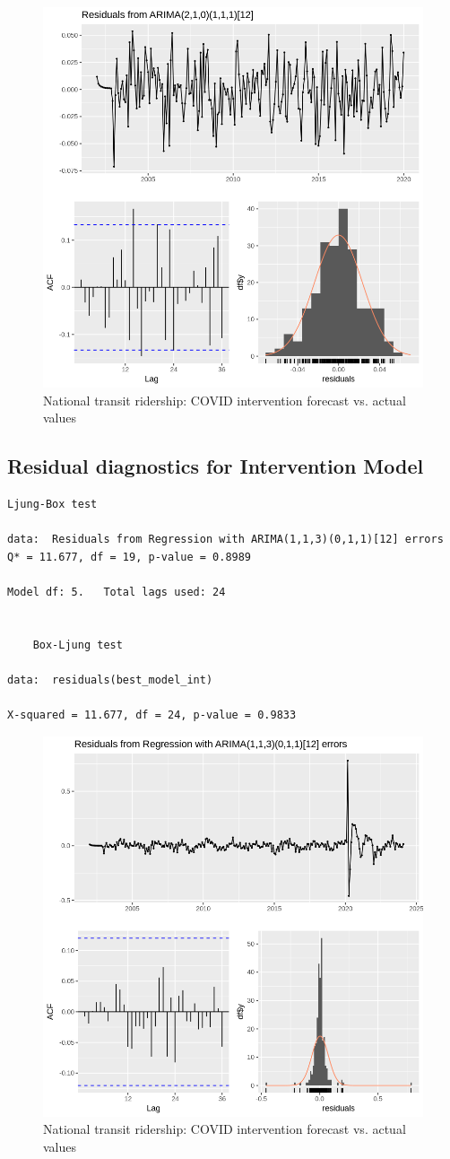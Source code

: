 \documentclass[11pt]{article}
\begin{document}
\begin{figure}[!ht]
\centering
\includegraphics[width=0.485\linewidth]{residual_diag_1.png}
\caption{National transit ridership: COVID intervention forecast vs. actual values}
\label{f:pre-COVID_residual_diagnostics}
\end{figure}


\subsection*{Residual diagnostics for Intervention Model}
\begin{verbatim}
Ljung-Box test

data:  Residuals from Regression with ARIMA(1,1,3)(0,1,1)[12] errors  
Q* = 11.677, df = 19, p-value = 0.8989

Model df: 5.   Total lags used: 24


	Box-Ljung test

data:  residuals(best_model_int)  

X-squared = 11.677, df = 24, p-value = 0.9833    
\end{verbatim}



\begin{figure}[!ht]
\centering
\includegraphics[width=0.485\linewidth]{residual_diag_2.png}
\caption{National transit ridership: COVID intervention forecast vs. actual values}
\label{f:intervention_residual_diagnostics}
\end{figure}
\end{document}
